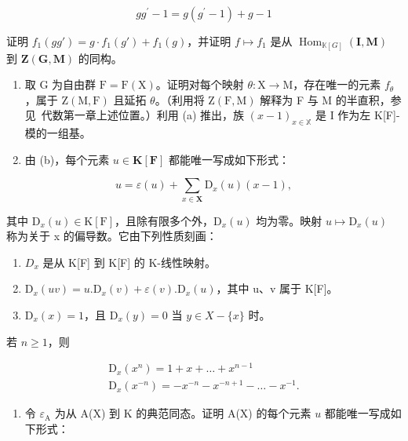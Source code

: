 \[
g g ^ {\prime} - 1 = g (g ^ {\prime} - 1) + g - 1
\]

证明 \(f_{1}(gg') = g \cdot f_{1}(g') + f_{1}(g)\)，并证明 \(f \mapsto f_{1}\) 是从 \(\operatorname{Hom}_{\mathbb{K}[G]}(\mathbf{I}, \mathbf{M})\) 到 \(\mathbf{Z}(\mathbf{G}, \mathbf{M})\) 的同构。

\begin{enumerate}
\def\labelenumi{(\alph{enumi})}
\setcounter{enumi}{1}
\item
  取 G 为自由群 \(\mathrm{F} = \mathrm{F}(\mathrm{X})\)。证明对每个映射 \(\theta: \mathrm{X} \to \mathrm{M}\)，存在唯一的元素 \(f_{\theta}\)，属于 \(\mathrm{Z}(\mathrm{M}, \mathrm{F})\) 且延拓 \(\theta\)。（利用将 \(\mathrm{Z}(\mathrm{F}, \mathrm{M})\) 解释为 F 与 M 的半直积，参见~代数第一章上述位置。）利用 (a) 推出，族 \((x - 1)_{x \in \mathbb{X}}\) 是 I 作为左 K{[}F{]}-模的一组基。
\item
  由 (b)，每个元素 \(u \in \mathbf{K}[\mathbf{F}]\) 都能唯一写成如下形式：
\end{enumerate}

\[
u = \varepsilon (u) + \sum_ {x \in \mathbf {X}} \mathrm{D} _ {x} (u) (x - 1),
\]

其中 \(\mathrm{D}_{x}(u)\in\mathrm{K}[\mathrm{F}]\)，且除有限多个外，\(\mathrm{D}_{x}(u)\) 均为零。映射 \(u\mapsto\mathrm{D}_{x}(u)\) 称为关于 x 的偏导数。它由下列性质刻画：

\begin{enumerate}
\def\labelenumi{(\roman{enumi})}
\item
  \(D_{x}\) 是从 K{[}F{]} 到 K{[}F{]} 的 K-线性映射。
\item
  \(\mathrm{D}_{x}(uv)=u.\mathrm{D}_{x}(v)+\varepsilon(v).\mathrm{D}_{x}(u)\)，其中 u、v 属于 K{[}F{]}。
\item
  \(\mathrm{D}_{x}(x)=1\)，且 \(\mathrm{D}_{x}(y)=0\) 当 \(y\in X-\{x\}\) 时。
\end{enumerate}

若 \(n\geqslant 1\)，则

\[
\begin{array}{c} \mathrm{D} _ {x} (x ^ {n}) = 1 + x + \dots + x ^ {n - 1} \\ \mathrm{D} _ {x} (x ^ {- n}) = - x ^ {- n} - x ^ {- n + 1} - \dots - x ^ {- 1}. \end{array}
\]

\begin{enumerate}
\def\labelenumi{(\alph{enumi})}
\setcounter{enumi}{3}
\tightlist
\item
  令 \(\varepsilon_{\mathrm{A}}\) 为从 A(X) 到 K 的典范同态。证明 A(X) 的每个元素 \(u\) 都能唯一写成如下形式：
\end{enumerate}

